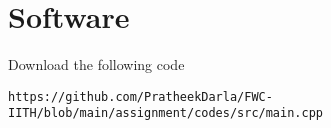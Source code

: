 \documentclass[10pt, a4paper]{article}
\begin{document}
\vspace{10mm}  

\section{Software}
 Download the following code
 \begin{lstlisting}
https://github.com/PratheekDarla/FWC-IITH/blob/main/assignment/codes/src/main.cpp
 \end{lstlisting}
\end{document}
